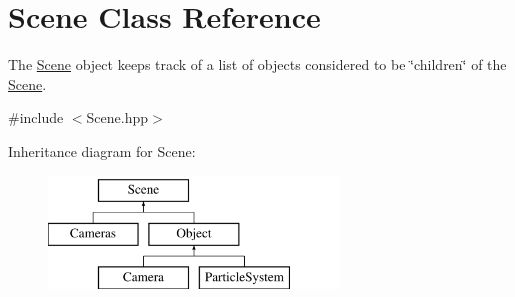 \hypertarget{class_scene}{\section{Scene Class Reference}
\label{class_scene}
}


The \hyperlink{class_scene}{Scene} object keeps track of a list of objects considered to be \char`\"{}children\char`\"{} of the \hyperlink{class_scene}{Scene}.  




{\ttfamily \#include $<$Scene.\-hpp$>$}

Inheritance diagram for Scene\-:\begin{figure}[H]
\begin{center}
\leavevmode
\includegraphics[height=3.000000cm]{class_scene}
\end{center}
\end{figure}
